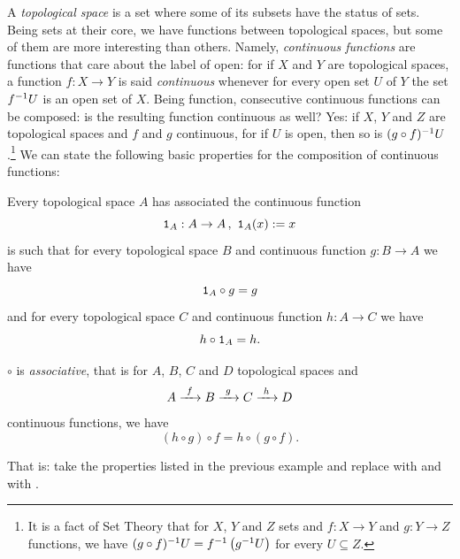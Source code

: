 \begin{example}[Topology]\label{example:Top}
  A {\em topological space} is a set where some of its subsets have the
  status of  sets. Being sets at their core, we have functions
  between topological spaces, but some of them are more interesting than
  others. Namely, {\em continuous functions} are functions that care
  about the label of open: for if \(X\) and \(Y\) are topological
  spaces, a function \(f : X \to Y\) is said {\em continuous} whenever for
  every open set \(U\) of \(Y\) the set \(f^{-1} U\) is an open set of
  \(X\). Being function, consecutive continuous functions can be
  composed: is the resulting function continuous as well? Yes: if \(X\),
  \(Y\) and \(Z\) are topological spaces and \(f\) and \(g\) continuous,
  for if \(U\) is open, then so is \((g \circ f)^{-1}U\).\footnote{It is a
    fact of Set Theory that for \(X\), \(Y\) and \(Z\) sets and
    \(f : X \to Y\) and \(g : Y \to Z\) functions, we have
    \((g \circ f)^{-1}U = f^{-1} \left(g^{-1} U\right)\) for every
    \(U \subseteq Z\).} We can state the following basic properties for the
  composition of continuous functions:
  \begin{tcbenum}
  \item Every topological space \(A\) has associated the continuous
    function
    \[\mathtt 1_A : A \to A \,,\ \mathtt 1_A (x) := x\]
    is such that for every topological space \(B\) and continuous
    function \(g : B \to A\) we have
    \[\mathtt 1_A \circ g = g\]
    and for every topological space \(C\) and continuous function
    \(h : A \to C\) we have
    \[h \circ \mathtt 1_A = h .\]
  \item \(\circ\) is {\em associative}, that is for \(A\), \(B\), \(C\) and
    \(D\) topological spaces and
    \[A \xrightarrow{\ f\ } B \xrightarrow{\ g\ } C \xrightarrow{\ h\ } D\] continuous functions,
    we have
    \[(h \circ g) \circ f = h \circ (g \circ f) .\]
  \end{tcbenum}
  That is: take the properties listed in the previous example and
  replace  with  and  with
  .
\end{example}

